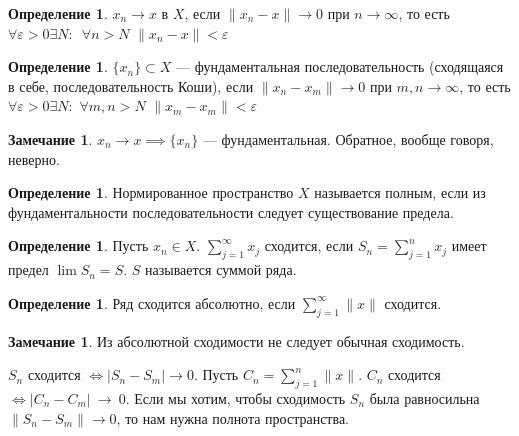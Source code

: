 \documentclass[11pt,openany,a4paper]{scrartcl}
\theoremstyle{plain}
\theoremstyle{definition}
\newtheorem{definition}[theorem]{Определение}
\newtheorem{remark}[theorem]{Замечание}
\begin{document}
\begin{definition}
	$x_n \to x$ в $X$, если $\|x_n - x\| \to 0$ при $n \to \infty$, то есть $\forall 
	\varepsilon > 0 \exists N:$~$\forall n > N$ $\|x_n - x\| < \varepsilon$
\end{definition}

\begin{definition}
	$\{x_n\} \subset X$ — фундаментальная последовательность (сходящаяся в себе, 
	последовательность Коши), если $\|x_n - x_m\| \to 0$ при $m,n \to \infty$, то есть
	$\forall \varepsilon > 0 \exists N:$ $\forall m,n > N$ $\|x_m - x_m\| < \varepsilon$
\end{definition}

\begin{remark}
	$x_n \to x \implies \{x_n\}$ — фундаментальная. Обратное, вообще говоря, неверно.
\end{remark}
\begin{definition}
	Нормированное пространство $X$ называется полным, если из фундаментальности 
	последовательности следует существование предела.
\end{definition}

\begin{definition}
	Пусть $x_n \in X$. $\sum\limits_{j = 1}^\infty x_j$ сходится, если
	$S_n = \sum\limits_{j = 1}^n x_j$ имеет предел $\lim S_n = S$. $S$ называется
	суммой ряда.
\end{definition}

\begin{definition}
	Ряд сходится абсолютно, если $\sum\limits_{j = 1}^\infty \|x\|$ сходится.
\end{definition}
\begin{remark}
	Из абсолютной сходимости не следует обычная сходимость.
\end{remark}

$S_n$ сходится $\iff |S_n - S_m| \to 0$. Пусть $C_n = \sum\limits_{j = 1}^n \|x\|$.
$C_n$ сходится $\iff |C_n - C_m|~\to~0$.
Если мы хотим, чтобы сходимость $S_n$ была равносильна
$\|S_n - S_m\| \to 0$, то нам нужна полнота пространства.
\end{document}
